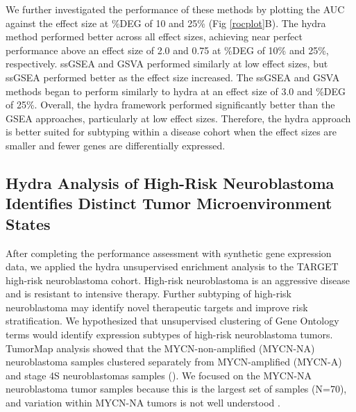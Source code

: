 \documentclass[10pt,letterpaper]{article}
\begin{document}
We further investigated the performance of these methods by plotting the AUC against the effect size at \%DEG of 10 and 25\% (Fig \ref{rocplot}B). The hydra method performed better across all effect sizes, achieving near perfect performance above an effect size of 2.0 and 0.75 at \%DEG of 10\% and 25\%, respectively. ssGSEA and GSVA performed similarly at low effect sizes, but ssGSEA performed better as the effect size increased. The ssGSEA and GSVA methods began to perform similarly to hydra at an effect size of 3.0 and \%DEG of 25\%. Overall, the hydra framework performed significantly better than the GSEA approaches, particularly at low effect sizes. Therefore, the hydra approach is better suited for subtyping within a disease cohort when the effect sizes are smaller and fewer genes are differentially expressed.

\subsection{Hydra Analysis of High-Risk Neuroblastoma Identifies Distinct Tumor Microenvironment States}
After completing the performance assessment with synthetic gene expression data, we applied the hydra unsupervised enrichment analysis to the TARGET high-risk neuroblastoma cohort. High-risk neuroblastoma is an aggressive disease and is resistant to intensive therapy. Further subtyping of high-risk neuroblastoma may identify novel therapeutic targets and improve risk stratification. We hypothesized that unsupervised clustering of Gene Ontology terms would identify expression subtypes of high-risk neuroblastoma tumors. TumorMap analysis showed that the MYCN-non-amplified (MYCN-NA) neuroblastoma samples clustered separately from MYCN-amplified (MYCN-A) and stage 4S neuroblastomas samples (). We focused on the MYCN-NA neuroblastoma tumor samples because this is the largest set of samples (N=70), and variation within MYCN-NA tumors is not well understood \cite{morgensternChallengeDefiningUltrahighrisk2019a}.
\end{document}

